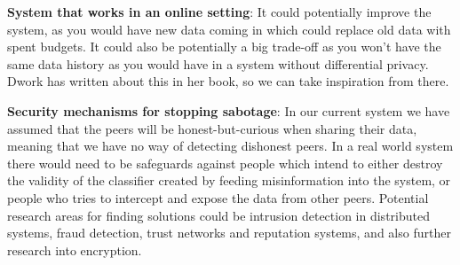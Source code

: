\vspace{2mm}
\noindent
\textbf{System that works in an online setting}: It could potentially improve the system, as you would have new data coming in which could replace old data with spent budgets. It could also be potentially a big trade-off as you won't have the same data history as you would have in a system without differential privacy. Dwork has written about this in her book, so we can take inspiration from there. 

\vspace{2mm}
\noindent
\textbf{Security mechanisms for stopping sabotage}: In our current system we have assumed that the peers will be honest-but-curious when sharing their data, meaning that we have no way of detecting dishonest peers. In a real world system there would need to be safeguards against people which intend to either destroy the validity of the classifier created by feeding misinformation into the system, or people who tries to intercept and expose the data from other peers. Potential research areas for finding solutions could be intrusion detection in distributed systems, fraud detection, trust networks and reputation systems, and also further research into encryption.  




\cleardoublepage